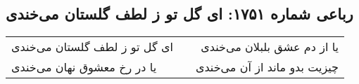 \begin{center}
\section*{رباعی شماره ۱۷۵۱: ای گل تو ز لطف گلستان می‌خندی}
\label{sec:1751}
\begin{longtable}{l p{0.5cm} r}
ای گل تو ز لطف گلستان می‌خندی
&&
یا از دم عشق بلبلان می‌خندی
\\
یا در رخ معشوق نهان می‌خندی
&&
چیزیت بدو ماند از آن می‌خندی
\\
\end{longtable}
\end{center}
